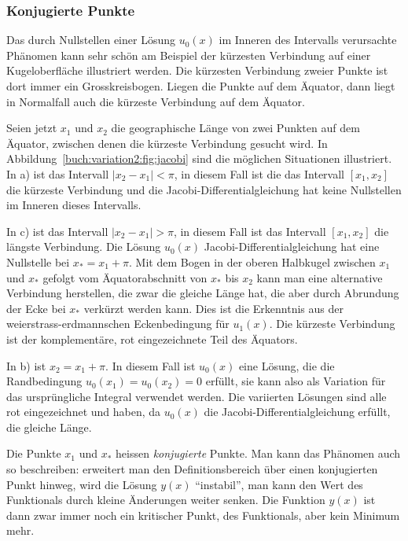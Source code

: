%
%
\subsubsection{Konjugierte Punkte}

Das durch Nullstellen einer Lösung $u_0(x)$ im Inneren des Intervalls
verursachte Phänomen kann sehr schön am Beispiel der kürzesten
Verbindung auf einer Kugeloberfläche illustriert werden.
Die kürzesten Verbindung zweier Punkte ist dort immer ein Grosskreisbogen.
Liegen die Punkte auf dem Äquator, dann liegt in Normalfall auch die
kürzeste Verbindung auf dem Äquator.

Seien jetzt $x_1$ und $x_2$ die geographische Länge von zwei Punkten
auf dem Äquator, zwischen denen die kürzeste Verbindung gesucht wird.
In Abbildung~\ref{buch:variation2:fig:jacobi} sind die möglichen
Situationen illustriert.
In a) ist das Intervall $|x_2-x_1|<\pi$, in diesem Fall ist die
das Intervall $[x_1,x_2]$ die kürzeste Verbindung und die 
Jacobi-Differentialgleichung hat keine Nullstellen im Inneren 
dieses Intervalls.

In c) ist das Intervall $|x_2-x_1|>\pi$, in diesem Fall ist das Intervall
$[x_1,x_2]$ die längste Verbindung.
Die Lösung $u_0(x)$ Jacobi-Differentialgleichung hat eine Nullstelle
bei $x_*=x_1+\pi$.
Mit dem Bogen in der oberen Halbkugel zwischen $x_1$ und $x_*$
gefolgt vom Äquatorabschnitt von $x_*$ bis $x_2$ kann man eine
alternative Verbindung herstellen, die zwar die gleiche Länge hat,
die aber durch Abrundung der Ecke bei $x_*$ verkürzt werden kann.
Dies ist die Erkenntnis aus der weierstrass-erdmannschen
Eckenbedingung für $u_1(x)$.
Die kürzeste Verbindung ist der komplementäre, rot eingezeichnete
Teil des Äquators.

In b) ist $x_2=x_1+\pi$.
In diesem Fall ist $u_0(x)$ eine Lösung, die die Randbedingung
$u_0(x_1)=u_0(x_2)=0$ erfüllt, sie kann also als Variation
für das ursprüngliche Integral verwendet werden.
Die variierten Lösungen sind alle rot eingezeichnet und haben,
da $u_0(x)$ die Jacobi-Differentialgleichung erfüllt, die gleiche
Länge.

Die Punkte $x_1$ und $x_*$ heissen {\em konjugierte} Punkte.
%
Man kann das Phänomen auch so beschreiben: erweitert man den
Definitionsbereich über einen konjugierten Punkt hinweg, wird die
Lösung $y(x)$ ``instabil'', man kann den Wert des Funktionals
durch kleine Änderungen weiter senken.
Die Funktion $y(x)$ ist dann zwar immer noch ein kritischer Punkt,
des Funktionals, aber kein Minimum mehr.

